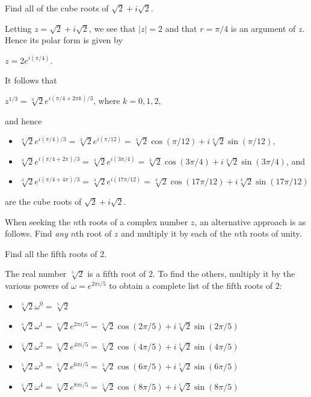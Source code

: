 \documentclass[11pt,fleqn,dvipsnames,usenames]{article}
\newcommand{\p}{\noindent}
\begin{document}
%
\begin{example}
Find all of the cube roots of $\sqrt{2} + i\sqrt{2}$.
\end{example}
%
\begin{solution}
Letting $z = \sqrt{2} + i\sqrt{2}$, we see that $|z| = 2$ and that $r = \pi/4$ is an argument of $z$.  Hence its polar form is given by
\begin{center}
$z = 2e^{i(\pi/4)}$.
\end{center}
\p It follows that
\begin{center}
$z^{1/3} = \sqrt[3]{2}e^{i(\pi/4 + 2\pi k)/3}$, where $k = 0,1,2$,
\end{center}
\p and hence
\begin{itemize}[\ ]
\item $\sqrt[3]{2}e^{i(\pi/4)/3} = \sqrt[3]{2}e^{i(\pi/12)} = \sqrt[3]{2}\cos(\pi/12) + i\sqrt[3]{2}\sin(\pi/12)$,
\item $\sqrt[3]{2}e^{i(\pi/4 + 2\pi)/3} = \sqrt[3]{2}e^{i(3\pi/4)} = \sqrt[3]{2}\cos(3\pi/4) + i\sqrt[3]{2}\sin(3\pi/4)$, and
\item $\sqrt[3]{2}e^{i(\pi/4 + 4\pi)/3} = \sqrt[3]{2}e^{i(17\pi/12)} = \sqrt[3]{2}\cos(17\pi/12) + i\sqrt[3]{2}\sin(17\pi/12)$
\end{itemize}
are the cube roots of $\sqrt{2} + i\sqrt{2}$.
\end{solution}
%
\begin{remark}
When seeking the $n$th roots of a complex number $z$, an alternative approach is as follows.  Find \emph{any} $n$th root of $z$ and multiply it by each of the $n$th roots of unity.
\end{remark}
%
\begin{example}
Find all the fifth roots of $2$.
\end{example}
%
\begin{solution}
The real number $\sqrt[5]{2}$ is a fifth root of $2$.  To find the others, multiply it by the various powers of $\omega = e^{2\pi i/5}$ to obtain a complete list of the fifth roots of $2$:
\begin{itemize}[\ ]
\item $\sqrt[5]{2}\omega^{0} = \sqrt[5]{2}$
\item $\sqrt[5]{2}\omega^{1} = \sqrt[5]{2}e^{2\pi i/5} = \sqrt[5]{2}\cos(2\pi/5) + i\sqrt[5]{2}\sin(2\pi/5)$
\item $\sqrt[5]{2}\omega^{2} = \sqrt[5]{2}e^{4\pi i/5} = \sqrt[5]{2}\cos(4\pi/5) + i\sqrt[5]{2}\sin(4\pi/5)$
\item $\sqrt[5]{2}\omega^{3} = \sqrt[5]{2}e^{6\pi i/5} = \sqrt[5]{2}\cos(6\pi/5) + i\sqrt[5]{2}\sin(6\pi/5)$
\item $\sqrt[5]{2}\omega^{4} = \sqrt[5]{2}e^{8\pi i/5} = \sqrt[5]{2}\cos(8\pi/5) + i\sqrt[5]{2}\sin(8\pi/5)$
\end{itemize}
\end{solution}
%
\end{document}
